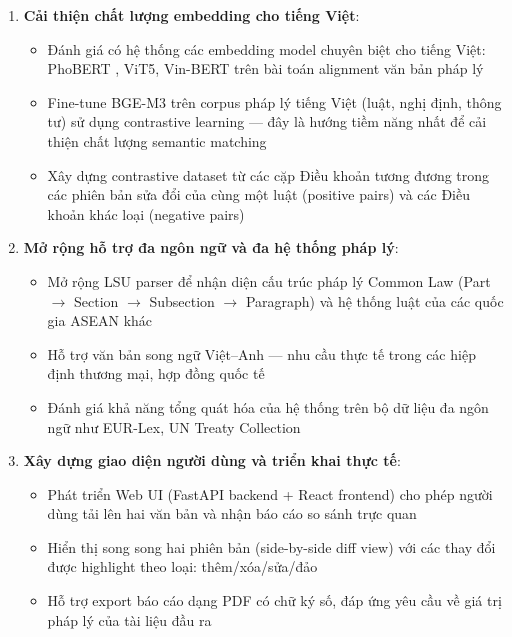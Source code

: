\begin{enumerate}[label=\textbf{(\arabic*)}]
    \item \textbf{Cải thiện chất lượng embedding cho tiếng Việt}:
    \begin{itemize}
        \item Đánh giá có hệ thống các embedding model chuyên biệt cho tiếng Việt: PhoBERT \cite{phobert2020}, ViT5, Vin-BERT trên bài toán alignment văn bản pháp lý
        \item Fine-tune BGE-M3 trên corpus pháp lý tiếng Việt (luật, nghị định, thông tư) sử dụng contrastive learning — đây là hướng tiềm năng nhất để cải thiện chất lượng semantic matching
        \item Xây dựng contrastive dataset từ các cặp Điều khoản tương đương trong các phiên bản sửa đổi của cùng một luật (positive pairs) và các Điều khoản khác loại (negative pairs)
    \end{itemize}

    \item \textbf{Mở rộng hỗ trợ đa ngôn ngữ và đa hệ thống pháp lý}:
    \begin{itemize}
        \item Mở rộng LSU parser để nhận diện cấu trúc pháp lý Common Law (Part $\rightarrow$ Section $\rightarrow$ Subsection $\rightarrow$ Paragraph) và hệ thống luật của các quốc gia ASEAN khác
        \item Hỗ trợ văn bản song ngữ Việt--Anh — nhu cầu thực tế trong các hiệp định thương mại, hợp đồng quốc tế
        \item Đánh giá khả năng tổng quát hóa của hệ thống trên bộ dữ liệu đa ngôn ngữ như EUR-Lex, UN Treaty Collection
    \end{itemize}

    \item \textbf{Xây dựng giao diện người dùng và triển khai thực tế}:
    \begin{itemize}
        \item Phát triển Web UI (FastAPI backend + React frontend) cho phép người dùng tải lên hai văn bản và nhận báo cáo so sánh trực quan
        \item Hiển thị song song hai phiên bản (side-by-side diff view) với các thay đổi được highlight theo loại: thêm/xóa/sửa/đảo
        \item Hỗ trợ export báo cáo dạng PDF có chữ ký số, đáp ứng yêu cầu về giá trị pháp lý của tài liệu đầu ra
    \end{itemize}


\end{enumerate}
